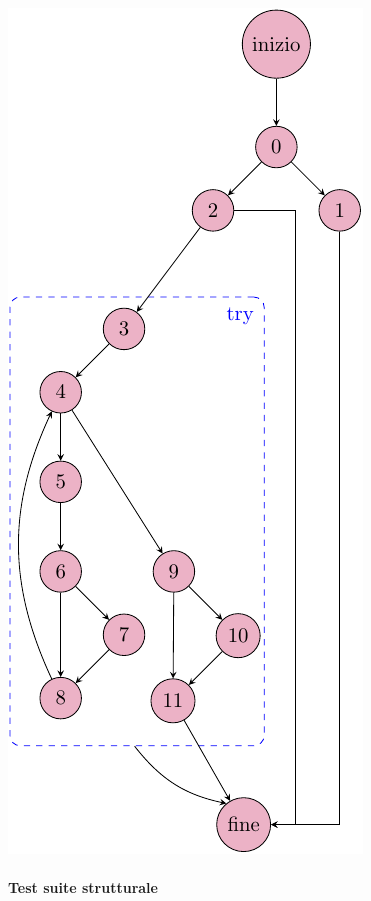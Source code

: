 \noindent\begin{minipage}[t]{0.38\linewidth}
	\vspace{0pt}
	\includegraphics{chapters/testing_white_box/cfg_creaOrdine.pdf}
\end{minipage}

\vfill
\pagebreak

\paragraph{Test suite strutturale}\mbox{}\newline


